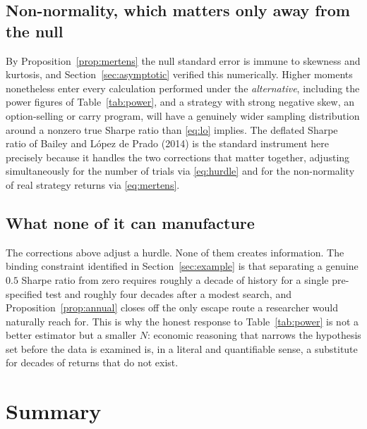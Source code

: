 \documentclass[11pt]{article}
\theoremstyle{remark}
\theoremstyle{definition}
\begin{document}
\subsection{Non-normality, which matters only away from the null}

By Proposition~\ref{prop:mertens} the null standard error is immune to skewness and kurtosis, and Section~\ref{sec:asymptotic} verified this numerically. Higher moments nonetheless enter every calculation performed under the \emph{alternative}, including the power figures of Table~\ref{tab:power}, and a strategy with strong negative skew, an option-selling or carry program, will have a genuinely wider sampling distribution around a nonzero true Sharpe ratio than \eqref{eq:lo} implies. The deflated Sharpe ratio of Bailey and L\'opez de Prado (2014) is the standard instrument here precisely because it handles the two corrections that matter together, adjusting simultaneously for the number of trials via \eqref{eq:hurdle} and for the non-normality of real strategy returns via \eqref{eq:mertens}.

\subsection{What none of it can manufacture}

The corrections above adjust a hurdle. None of them creates information. The binding constraint identified in Section~\ref{sec:example} is that separating a genuine $0.5$ Sharpe ratio from zero requires roughly a decade of history for a single pre-specified test and roughly four decades after a modest search, and Proposition~\ref{prop:annual} closes off the only escape route a researcher would naturally reach for. This is why the honest response to Table~\ref{tab:power} is not a better estimator but a smaller $N$: economic reasoning that narrows the hypothesis set before the data is examined is, in a literal and quantifiable sense, a substitute for decades of returns that do not exist.

\section{Summary}
\label{sec:summary}
\end{document}
